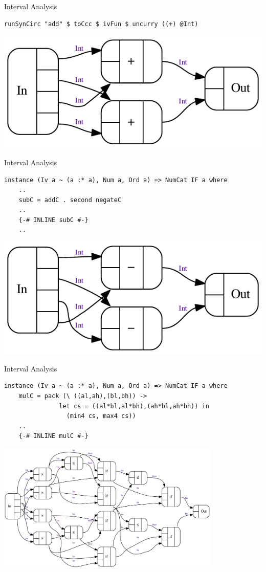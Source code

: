 \documentclass[10pt]{beamer}
\theoremstyle{definition}
\theoremstyle{remark}
\numberwithin{equation}{section}
\begin{document}
\begin{frame}[fragile]{Interval Analysis}
  \begin{lstlisting}[frame=single]
    runSynCirc "add" $ toCcc $ ivFun $ uncurry ((+) @Int)
  \end{lstlisting}
  \includegraphics{add-iv.pdf}
\end{frame}

\begin{frame}[fragile]{Interval Analysis}
  \begin{lstlisting}[frame=single]
  instance (Iv a ~ (a :* a), Num a, Ord a) => NumCat IF a where
    ..
    subC = addC . second negateC
    ..
    {-# INLINE subC #-}
    ..
  \end{lstlisting}
  \includegraphics{sub-iv.pdf}
\end{frame}

\begin{frame}[fragile]{Interval Analysis}
  \begin{lstlisting}[frame=single]
  instance (Iv a ~ (a :* a), Num a, Ord a) => NumCat IF a where
    mulC = pack (\ ((al,ah),(bl,bh)) ->
               let cs = ((al*bl,al*bh),(ah*bl,ah*bh)) in
                 (min4 cs, max4 cs))
    ..
    {-# INLINE mulC #-}
  \end{lstlisting}
  \begin{center}
    \includegraphics[width=0.8\textwidth]{mul-iv.pdf}
  \end{center}
\end{frame}
\end{document}
